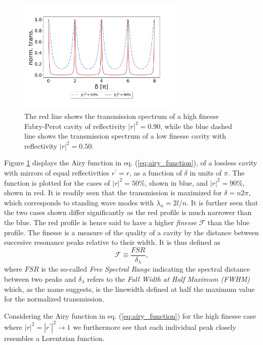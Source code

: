 \begin{figure}[h!]
    \centering
    \includegraphics[width=0.7\textwidth]{figures/fabry_perot_high_and_low_finesse.pdf}
    \caption{The red line shows the transmission spectrum of a high finesse Fabry-Perot cavity of reflectivity $|r|^2 = 0.90$, while the blue dashed line shows the transmission spectrum of a low finesse cavity with reflectivity $|r|^2 = 0.50$.}
    \label{fig:fabry_perot_trans}
\end{figure}

Figure \ref{fig:fabry_perot_trans} displays the Airy function in eq. (\ref{eq:airy_function}), of a lossless cavity with mirrors of equal reflectivities $r^{\prime} = r$, as a function of $\delta$ in units of $\pi$. The function is plotted for the cases of $|r|^2 = 50 \%$, shown in blue, and $|r|^2 = 90 \%$, shown in red. It is readily seen that the transmission is maximized for $\delta = n 2 \pi$, which corresponds to standing wave modes with $\lambda_n = 2l/n$. It is further seen that the two cases shown differ significantly as the red profile is much narrower than the blue. The red profile is hence said to have a higher \emph{finesse} $\mathcal{F}$ than the blue profile. The finesse is a measure of the quality of a cavity by the distance between succesive resonance peaks relative to their width. It is thus defined as
\begin{equation}
    \mathcal{F} \equiv \frac{FSR}{\delta_{\lambda}},
    \label{eq:finesse_definition}
\end{equation}
where $FSR$ is the so-called \emph{Free Spectral Range} indicating the spectral distance between two peaks and $\delta_{\lambda}$ refers to the \emph{Full Width at Half Maximum (FWHM)} which, as the name suggests, is the linewidth defined at half the maximum value for the normalized transmission.

Considering the Airy function in eq. (\ref{eq:airy_function}) for the high finesse case where $|r|^2 = |r^{\prime}|^2 \rightarrow 1$ we furthermore see that each individual peak closely resembles a Lorentzian function. 

